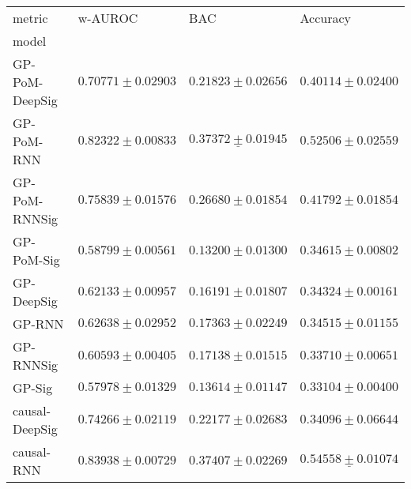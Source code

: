 \begin{tabular}{llll}
\toprule
metric &                                           w-AUROC &                                               BAC &                                          Accuracy \\
model          &                                                   &                                                   &                                                   \\
\midrule
GP-PoM-DeepSig &                           $ 0.70771 \pm 0.02903 $ &                           $ 0.21823 \pm 0.02656 $ &                           $ 0.40114 \pm 0.02400 $ \\
GP-PoM-RNN     &                           $ 0.82322 \pm 0.00833 $ &            $  \underline{ 0.37372 \pm 0.01945 } $ &                           $ 0.52506 \pm 0.02559 $ \\
GP-PoM-RNNSig  &                           $ 0.75839 \pm 0.01576 $ &                           $ 0.26680 \pm 0.01854 $ &                           $ 0.41792 \pm 0.01854 $ \\
GP-PoM-Sig     &                           $ 0.58799 \pm 0.00561 $ &                           $ 0.13200 \pm 0.01300 $ &                           $ 0.34615 \pm 0.00802 $ \\
GP-DeepSig     &                           $ 0.62133 \pm 0.00957 $ &                           $ 0.16191 \pm 0.01807 $ &                           $ 0.34324 \pm 0.00161 $ \\
GP-RNN         &                           $ 0.62638 \pm 0.02952 $ &                           $ 0.17363 \pm 0.02249 $ &                           $ 0.34515 \pm 0.01155 $ \\
GP-RNNSig      &                           $ 0.60593 \pm 0.00405 $ &                           $ 0.17138 \pm 0.01515 $ &                           $ 0.33710 \pm 0.00651 $ \\
GP-Sig         &                           $ 0.57978 \pm 0.01329 $ &                           $ 0.13614 \pm 0.01147 $ &                           $ 0.33104 \pm 0.00400 $ \\
causal-DeepSig &                           $ 0.74266 \pm 0.02119 $ &                           $ 0.22177 \pm 0.02683 $ &                           $ 0.34096 \pm 0.06644 $ \\
causal-RNN     &               $  \mathbf{ 0.83938 \pm 0.00729 } $ &               $  \mathbf{ 0.37407 \pm 0.02269 } $ &  $  \mathbf{ \underline{ 0.54558 \pm 0.01074 }} $ \\

\end{tabular}
